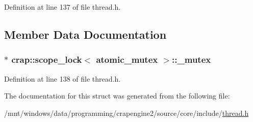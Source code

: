 Definition at line 137 of file thread.\+h.



\subsection{Member Data Documentation}
\hypertarget{structcrap_1_1scope__lock_3_01atomic__mutex_01_4_a84842a0c0f70416a6b5276469ec292ce}{}
\subsubsection[{\+\_\+mutex}]{$\ast$ {\bf crap\+::scope\+\_\+lock}$<$ {\bf atomic\+\_\+mutex} $>$\+::\+\_\+mutex}\label{structcrap_1_1scope__lock_3_01atomic__mutex_01_4_a84842a0c0f70416a6b5276469ec292ce}


Definition at line 138 of file thread.\+h.



The documentation for this struct was generated from the following file\+:\begin{DoxyCompactItemize}
\item 
/mnt/windows/data/programming/crapengine2/source/core/include/\hyperlink{thread_8h}{thread.\+h}\end{DoxyCompactItemize}
